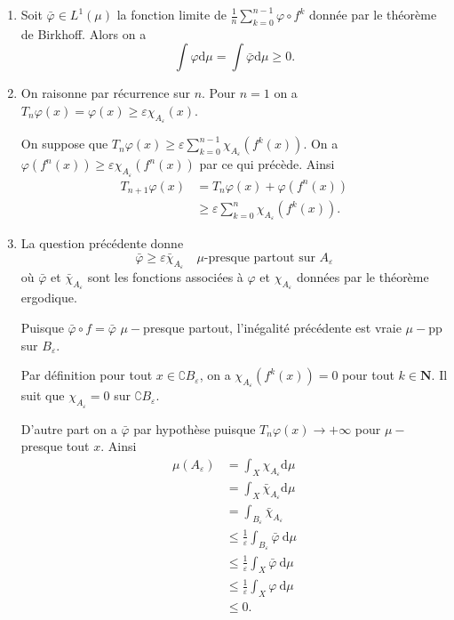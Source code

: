 \documentclass[a4paper,12pt,openany]{article}
\theoremstyle{plain}
\theoremstyle{definition}
\newcommand{\dd}{\mathrm{d}}
\newcommand{\N}{\mathbf{N}}
\begin{document}
 \vspace{1.5mm} 

\begin{enumerate}
\item Soit $\bar \varphi \in L^1(\mu)$ la fonction limite de $\displaystyle{\frac{1}{n}\sum_{k=0}^{n-1} \varphi \circ f^k}$ donn\'ee par le th\'eor\`eme de Birkhoff. Alors on a 
$$
\int \varphi \dd \mu = \int \bar \varphi \dd \mu \geqslant 0.
$$
\item On raisonne par r\'ecurrence sur $n$.  Pour $n = 1$ on a $T_n \varphi(x) = \varphi(x) \geqslant \varepsilon \chi_{A_\varepsilon}(x)$.  

On suppose que $\displaystyle{T_n \varphi(x) \geqslant \varepsilon \sum_{k=0}^{n-1} \chi_{A_\varepsilon}(f^k(x)).}$ On a $\varphi(f^n(x)) \geqslant \varepsilon \chi_{A_\varepsilon}(f^n(x))$ par ce qui pr\'ec\`ede.  Ainsi
$$
\begin{aligned}
T_{n+1}\varphi(x) &= T_n \varphi(x) + \varphi(f^n(x))  \\
& \geqslant \varepsilon \sum_{k=0}^n \chi_{A_\varepsilon}(f^k(x)).
\end{aligned}
$$

\item La question pr\'ec\'edente donne
$$
\bar \varphi \geqslant \varepsilon \bar \chi_{A_\varepsilon} \quad\mu\text{-presque partout sur }A_\varepsilon
$$
o\`u $\bar \varphi$ et $\bar \chi_{A_\varepsilon}$ sont les fonctions associ\'ees \`a $\varphi$ et $\chi_{A_\varepsilon}$ donn\'ees par le th\'eor\`eme ergodique.  

Puisque $\bar \varphi \circ f = \bar \varphi$ $\mu-$presque partout, l'in\'egalit\'e pr\'ec\'edente est vraie $\mu-$pp sur $B_\varepsilon.$



Par d\'efinition pour tout $x \in \complement B_\varepsilon$, on a $\chi_{A_\varepsilon}(f^k(x)) = 0$ pour tout $k \in \N.$ Il suit que $\chi_{A_\varepsilon} = 0$ sur $\complement B_\varepsilon$.  

D'autre part on a $\bar \varphi$ par hypoth\`ese puisque $T_n \varphi(x) \to +\infty$ pour $\mu-$presque tout $x$.  Ainsi
$$
\begin{aligned}
\mu(A_\varepsilon) &= \int_X \chi_{A_\varepsilon} \dd \mu  \\
& = \int_X \bar \chi_{A_\varepsilon} \dd \mu  \\ 
&= \int_{B_\varepsilon} \bar \chi_{A_\varepsilon}  \\
& \leqslant \frac{1}{\varepsilon} \int_{B_\varepsilon} \bar \varphi~\dd \mu  \\
& \leqslant \frac{1}{\varepsilon} \int_X \bar \varphi~ \dd \mu  \\
& \leqslant \frac{1}{\varepsilon} \int_X \varphi~ \dd \mu  \\
&\leqslant 0.
\end{aligned}
$$
 

\end{enumerate}
\end{document}
